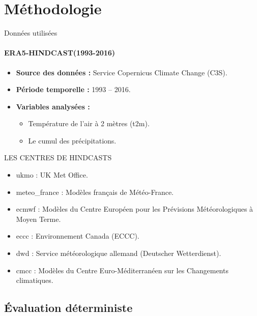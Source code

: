 \section{Méthodologie}





\begin{frame}{Données utilisées}
\framesubtitle{ERA5-HINDCAST(1993-2016)}

  \begin{itemize}
    \item \textbf{Source des données :} Service Copernicus Climate Change (C3S).
    \item \textbf{Période temporelle :} 1993 -- 2016.
    \item \textbf{Variables analysées :}
    \begin{itemize}
      \item Température de l'air à 2 mètres (t2m).
      \item Le cumul des précipitations.
      
    \end{itemize}
  
  \end{itemize}
\end{frame}

\begin{frame}{LES CENTRES DE HINDCASTS}
\begin{itemize}
    \item ukmo : UK Met Office.
    \item meteo\_france : Modèles français de Météo-France.
    \item ecmwf : Modèles du Centre Européen pour les Prévisions Météorologiques à Moyen Terme.
    \item eccc : Environnement Canada (ECCC).
    \item dwd : Service météorologique allemand (Deutscher Wetterdienst).
    \item cmcc : Modèles du Centre Euro-Méditerranéen sur les Changements climatiques.
\end{itemize}
\end{frame}
\subsection{Évaluation déterministe}

